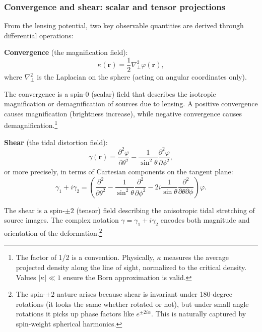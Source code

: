 \subsubsection{Convergence and shear: scalar and tensor projections}

From the lensing potential, two key observable quantities are derived through differential operations:

\textbf{Convergence} (the magnification field):
\begin{equation}
\kappa(\mathbf{r}) = \frac{1}{2}\nabla^2_\perp \varphi(\mathbf{r}),
\label{eq:convergence_def}
\end{equation}
where $\nabla^2_\perp$ is the Laplacian on the sphere (acting on angular coordinates only).

The convergence is a spin-0 (scalar) field that describes the isotropic magnification or demagnification of sources
due to lensing. A positive convergence causes magnification (brightness increase), while negative convergence causes
demagnification.\footnote{The factor of 1/2 is a convention. Physically, $\kappa$ measures the average projected density
along the line of sight, normalized to the critical density. Values $|\kappa| \ll 1$ ensure the Born approximation is valid.}

\textbf{Shear} (the tidal distortion field):
\begin{equation}
\gamma(\mathbf{r}) = \frac{\partial^2 \varphi}{\partial\theta^2} - \frac{1}{\sin^2\theta}\frac{\partial^2 \varphi}{\partial\phi^2},
\label{eq:shear_complex}
\end{equation}
or more precisely, in terms of Cartesian components on the tangent plane:
\begin{equation}
\gamma_1 + i\gamma_2 = \left(\frac{\partial^2}{\partial\theta^2} - \frac{1}{\sin^2\theta}\frac{\partial^2}{\partial\phi^2} - 
2i\frac{1}{\sin\theta}\frac{\partial^2}{\partial\theta\partial\phi}\right)\varphi.
\label{eq:shear_cartesian}
\end{equation}

The shear is a spin-$\pm 2$ (tensor) field describing the anisotropic tidal stretching of source images. The complex notation
$\gamma = \gamma_1 + i\gamma_2$ encodes both magnitude and orientation of the deformation.\footnote{The spin-$\pm 2$ nature arises
because shear is invariant under 180-degree rotations (it looks the same whether rotated or not), but under small angle rotations
it picks up phase factors like $e^{\pm 2i\alpha}$. This is naturally captured by spin-weight spherical harmonics.}

